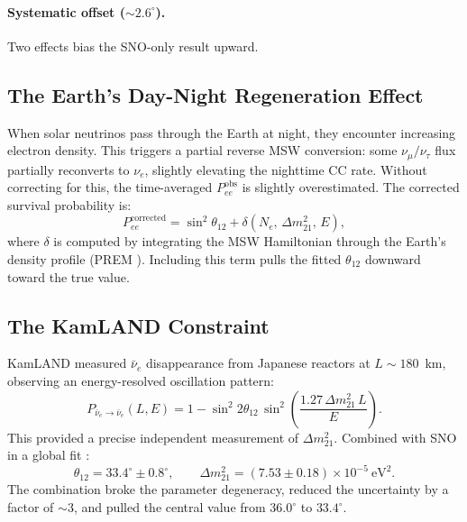 \documentclass[12pt, a4paper]{article}
\begin{document}
\paragraph{Systematic offset ($\sim\!2.6^\circ$).}
Two effects bias the SNO-only result upward.
 
\subsection{The Earth's Day-Night Regeneration Effect}
 
When solar neutrinos pass through the Earth at night, they encounter
increasing electron density.
This triggers a partial reverse MSW conversion: some $\nu_\mu/\nu_\tau$
flux partially reconverts to $\nu_e$, slightly elevating the nighttime
CC rate.
Without correcting for this, the time-averaged $P_{ee}^{\text{obs}}$
is slightly overestimated.
The corrected survival probability is:
\begin{equation}
    P_{ee}^{\text{corrected}}
    = \sin^2\theta_{12} + \delta(N_e,\, \Delta m^2_{21},\, E),
    \label{eq:regen}
\end{equation}
where $\delta$ is computed by integrating the MSW Hamiltonian through
the Earth's density profile (PREM \cite{PREM}).
Including this term pulls the fitted $\theta_{12}$ downward toward
the true value.
 
\subsection{The KamLAND Constraint}
 
KamLAND \cite{KamLAND2003} measured $\bar\nu_e$ disappearance from
Japanese reactors at $L \sim 180$~km, observing an energy-resolved
oscillation pattern:
\begin{equation}
    P_{\bar\nu_e \to \bar\nu_e}(L, E)
    = 1 - \sin^2 2\theta_{12}\,
      \sin^2\!\left(\frac{1.27\,\Delta m^2_{21}\,L}{E}\right).
    \label{eq:kamland}
\end{equation}
This provided a precise independent measurement of $\Delta m^2_{21}$.
Combined with SNO in a global fit \cite{PDG2022}:
\begin{equation}
    \theta_{12} = 33.4^\circ \pm 0.8^\circ,
    \qquad
    \Delta m^2_{21} = (7.53 \pm 0.18)\times 10^{-5}\ \text{eV}^2.
    \label{eq:pdg}
\end{equation}
The combination broke the parameter degeneracy, reduced the uncertainty
by a factor of $\sim\!3$, and pulled the central value from $36.0^\circ$
to $33.4^\circ$.
 
\end{document}
